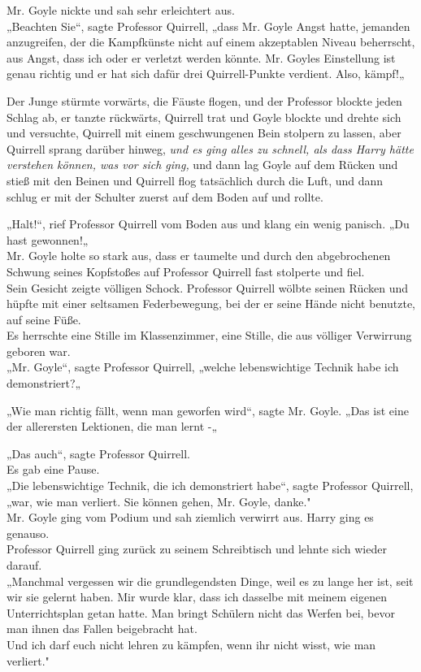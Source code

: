 {Mr. Goyle nickte und sah sehr erleichtert aus.\\ „Beachten Sie“, sagte Professor Quirrell, „dass Mr. Goyle Angst hatte, jemanden anzugreifen, der die Kampfkünste nicht auf einem akzeptablen Niveau beherrscht, aus Angst, dass ich oder er verletzt werden könnte. Mr. Goyles Einstellung ist genau richtig und er hat sich dafür drei Quirrell-Punkte verdient. Also, kämpf!„

Der Junge stürmte vorwärts, die Fäuste flogen, und der Professor blockte jeden Schlag ab, er tanzte rückwärts, Quirrell trat und Goyle blockte und drehte sich und versuchte, Quirrell mit einem geschwungenen Bein stolpern zu lassen, aber Quirrell sprang darüber hinweg, \emph{und es ging alles zu schnell, als dass Harry hätte verstehen können, was vor sich ging,} und dann lag Goyle auf dem Rücken und stieß mit den Beinen und Quirrell flog tatsächlich durch die Luft, und dann schlug er mit der Schulter zuerst auf dem Boden auf und rollte.

„Halt!“, rief Professor Quirrell vom Boden aus und klang ein wenig panisch. „Du hast gewonnen!„\\ Mr. Goyle holte so stark aus, dass er taumelte und durch den abgebrochenen Schwung seines Kopfstoßes auf Professor Quirrell fast stolperte und fiel.\\ Sein Gesicht zeigte völligen Schock. Professor Quirrell wölbte seinen Rücken und hüpfte mit einer seltsamen Federbewegung, bei der er seine Hände nicht benutzte, auf seine Füße.\\ Es herrschte eine Stille im Klassenzimmer, eine Stille, die aus völliger Verwirrung geboren war.\\ „Mr. Goyle“, sagte Professor Quirrell, „welche lebenswichtige Technik habe ich demonstriert?„

„Wie man richtig fällt, wenn man geworfen wird“, sagte Mr. Goyle. „Das ist eine der allerersten Lektionen, die man lernt -„

„Das auch“, sagte Professor Quirrell.\\ Es gab eine Pause.\\ „Die lebenswichtige Technik, die ich demonstriert habe“, sagte Professor Quirrell, „war, wie man verliert. Sie können gehen, Mr. Goyle, danke."\\ Mr. Goyle ging vom Podium und sah ziemlich verwirrt aus. Harry ging es genauso.\\ Professor Quirrell ging zurück zu seinem Schreibtisch und lehnte sich wieder darauf.\\ „Manchmal vergessen wir die grundlegendsten Dinge, weil es zu lange her ist, seit wir sie gelernt haben. Mir wurde klar, dass ich dasselbe mit meinem eigenen Unterrichtsplan getan hatte. Man bringt Schülern nicht das Werfen bei, bevor man ihnen das Fallen beigebracht hat.\\ Und ich darf euch nicht lehren zu kämpfen, wenn ihr nicht wisst, wie man verliert."

}
